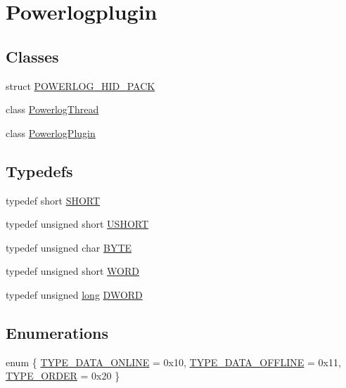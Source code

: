 \hypertarget{group__powerlogplugin}{\section{Powerlogplugin}
\label{group__powerlogplugin}
}
\subsection*{Classes}
\begin{DoxyCompactItemize}
\item 
struct \hyperlink{struct_p_o_w_e_r_l_o_g___h_i_d___p_a_c_k}{P\-O\-W\-E\-R\-L\-O\-G\-\_\-\-H\-I\-D\-\_\-\-P\-A\-C\-K}
\item 
class \hyperlink{class_powerlog_thread}{Powerlog\-Thread}
\item 
class \hyperlink{class_powerlog_plugin}{Powerlog\-Plugin}
\end{DoxyCompactItemize}
\subsection*{Typedefs}
\begin{DoxyCompactItemize}
\item 
typedef short \hyperlink{group__powerlogplugin_ga9909bd3cf05f0906045f2ee85be4eeac}{S\-H\-O\-R\-T}
\item 
typedef unsigned short \hyperlink{group__powerlogplugin_ga5850d5316caf7f4cedd742fdf8cd7c02}{U\-S\-H\-O\-R\-T}
\item 
typedef unsigned char \hyperlink{group__powerlogplugin_ga4ae1dab0fb4b072a66584546209e7d58}{B\-Y\-T\-E}
\item 
typedef unsigned short \hyperlink{group__powerlogplugin_ga197942eefa7db30960ae396d68339b97}{W\-O\-R\-D}
\item 
typedef unsigned \hyperlink{ioapi_8h_a3c7b35ad9dab18b8310343c201f7b27e}{long} \hyperlink{group__powerlogplugin_gad342ac907eb044443153a22f964bf0af}{D\-W\-O\-R\-D}
\end{DoxyCompactItemize}
\subsection*{Enumerations}
\begin{DoxyCompactItemize}
\item 
enum \{ \hyperlink{group__powerlogplugin_ggab59c1bec446b10af208f977a871d910bac15fdb2710957e40a4a55c6ae5fe8e0d}{T\-Y\-P\-E\-\_\-\-D\-A\-T\-A\-\_\-\-O\-N\-L\-I\-N\-E} = 0x10, 
\hyperlink{group__powerlogplugin_ggab59c1bec446b10af208f977a871d910ba6a82e6810b922850e28b6bef93e2bf6b}{T\-Y\-P\-E\-\_\-\-D\-A\-T\-A\-\_\-\-O\-F\-F\-L\-I\-N\-E} = 0x11, 
\hyperlink{group__powerlogplugin_ggab59c1bec446b10af208f977a871d910bab0d06ab870c13d3fdbeb5500c7100cf2}{T\-Y\-P\-E\-\_\-\-O\-R\-D\-E\-R} = 0x20
 \}
\end{DoxyCompactItemize}


